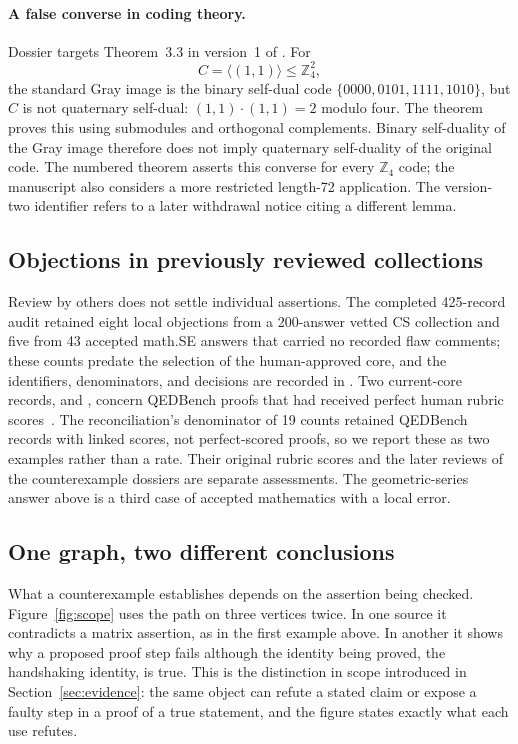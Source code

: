 \paragraph{A false converse in coding theory.}
Dossier  targets Theorem~3.3 in version~1 of \citet{dougherty2013automorphism}. For
\[
 C=\langle(1,1)\rangle\le\mathbb Z_4^2,
\]
the standard Gray image is the binary self-dual code $\{0000,0101,1111,1010\}$, but $C$ is not quaternary self-dual: $(1,1)\mathbin{\cdot}(1,1)=2$ modulo four. The theorem  proves this using submodules and orthogonal complements. Binary self-duality of the Gray image therefore does not imply quaternary self-duality of the original code. The numbered theorem asserts this converse for every $\mathbb Z_4$ code; the manuscript also considers a more restricted length-72 application. The version-two identifier refers to a later withdrawal notice citing a different lemma.

\subsection{Objections in previously reviewed collections}
\label{app:corpus-sources}
Review by others does not settle individual assertions. The completed 425-record audit retained eight local objections from a 200-answer vetted CS collection and five from 43 accepted math.SE answers that carried no recorded flaw comments; these counts predate the selection of the human-approved core, and the identifiers, denominators, and decisions are recorded in . Two current-core records,  and , concern QEDBench proofs that had received perfect human rubric scores~\citep{gonzalez2026qedbench}. The reconciliation's denominator of 19 counts retained QEDBench records with linked scores, not perfect-scored proofs, so we report these as two examples rather than a rate. Their original rubric scores and the later reviews of the counterexample dossiers are separate assessments. The geometric-series answer above is a third case of accepted mathematics with a local error.

\subsection{One graph, two different conclusions}
\label{app:path-scope}
What a counterexample establishes depends on the assertion being checked. Figure~\ref{fig:scope} uses the path on three vertices twice. In one source it contradicts a matrix assertion, as in the first example above. In another it shows why a proposed proof step fails although the identity being proved, the handshaking identity, is true. This is the distinction in scope introduced in Section~\ref{sec:evidence}: the same object can refute a stated claim or expose a faulty step in a proof of a true statement, and the figure states exactly what each use refutes.

